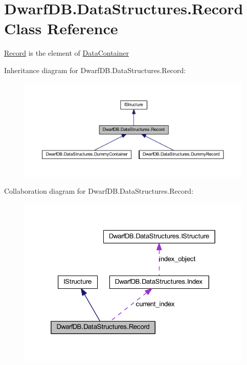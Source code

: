 \hypertarget{class_dwarf_d_b_1_1_data_structures_1_1_record}{\section{Dwarf\+D\+B.\+Data\+Structures.\+Record Class Reference}
\label{class_dwarf_d_b_1_1_data_structures_1_1_record}
}


\hyperlink{class_dwarf_d_b_1_1_data_structures_1_1_record}{Record} is the element of \hyperlink{class_dwarf_d_b_1_1_data_structures_1_1_data_container}{Data\+Container}  




Inheritance diagram for Dwarf\+D\+B.\+Data\+Structures.\+Record\+:
\nopagebreak
\begin{figure}[H]
\begin{center}
\leavevmode
\includegraphics[width=350pt]{class_dwarf_d_b_1_1_data_structures_1_1_record__inherit__graph}
\end{center}
\end{figure}


Collaboration diagram for Dwarf\+D\+B.\+Data\+Structures.\+Record\+:
\nopagebreak
\begin{figure}[H]
\begin{center}
\leavevmode
\includegraphics[width=325pt]{class_dwarf_d_b_1_1_data_structures_1_1_record__coll__graph}
\end{center}
\end{figure}
